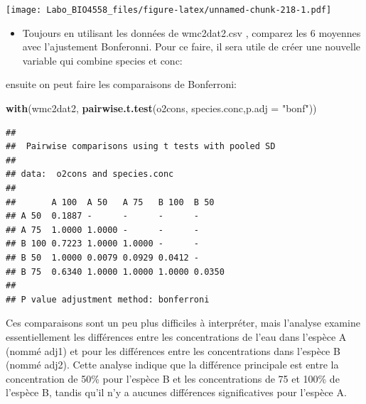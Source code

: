 \documentclass[12pt,]{book}
\newenvironment{Shaded}{\begin{snugshade}}{\end{snugshade}}
\newcommand{\DataTypeTok}[1]{\textcolor[rgb]{0.27,0.27,0.27}{#1}}
\newcommand{\KeywordTok}[1]{\textcolor[rgb]{0.27,0.27,0.27}{\textbf{#1}}}
\newcommand{\NormalTok}[1]{#1}
\newcommand{\OperatorTok}[1]{\textcolor[rgb]{0.43,0.43,0.43}{\textbf{#1}}}
\newcommand{\StringTok}[1]{\textcolor[rgb]{0.5,0.5,0.5}{#1}}
\providecommand{\tightlist}{%
  \setlength{\itemsep}{0pt}\setlength{\parskip}{0pt}}
\begin{document}
\texttt{[image: Labo\_BIO4558\_files/figure-latex/unnamed-chunk-218-1.pdf]}

\begin{itemize}
\tightlist
\item
  Toujours en utilisant les données de wmc2dat2.csv , comparez les 6 moyennes avec l'ajustement Bonferonni. Pour ce faire, il sera utile de créer une nouvelle variable qui combine species et conc:
\end{itemize}

\begin{Shaded}
\end{Shaded}

ensuite on peut faire les comparaisons de Bonferroni:

\begin{Shaded}
\begin{Highlighting}[]
\KeywordTok{with}\NormalTok{(wmc2dat2, }\KeywordTok{pairwise.t.test}\NormalTok{(o2cons, species.conc,}\DataTypeTok{p.adj =} \StringTok{"bonf"}\NormalTok{))}
\end{Highlighting}
\end{Shaded}

\begin{verbatim}
## 
## 	Pairwise comparisons using t tests with pooled SD 
## 
## data:  o2cons and species.conc 
## 
##       A 100  A 50   A 75   B 100  B 50  
## A 50  0.1887 -      -      -      -     
## A 75  1.0000 1.0000 -      -      -     
## B 100 0.7223 1.0000 1.0000 -      -     
## B 50  1.0000 0.0079 0.0929 0.0412 -     
## B 75  0.6340 1.0000 1.0000 1.0000 0.0350
## 
## P value adjustment method: bonferroni
\end{verbatim}

Ces comparaisons sont un peu plus difficiles à interpréter, mais l'analyse examine essentiellement les différences entre les concentrations de l'eau dans l'espèce A (nommé adj1) et pour les différences entre les concentrations dans l'espèce B (nommé adj2). Cette analyse indique que la différence principale est entre la concentration de 50\% pour l'espèce B et les concentrations de 75 et 100\% de l'espèce B, tandis qu'il n'y a aucunes différences significatives pour l'espèce A.
\end{document}
